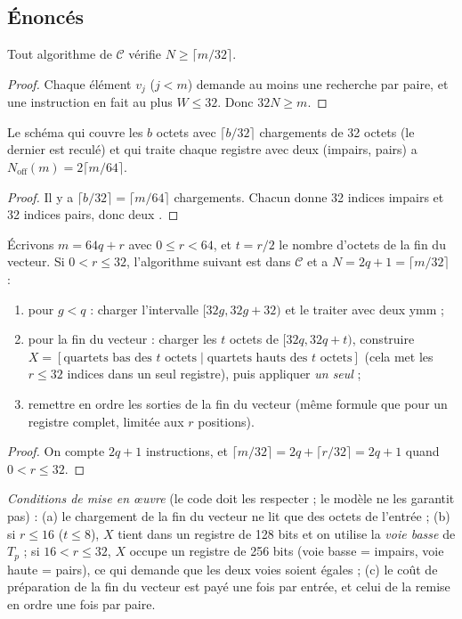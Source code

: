 \subsection{Énoncés}
\begin{proposition}[Limite]\label{prop:borne}
Tout algorithme de $\mathcal{C}$ vérifie $N\ge\lceil m/32\rceil$.
\end{proposition}
\begin{proof}
Chaque élément $v_j$ ($j<m$) demande au moins une recherche par paire, et une instruction en fait au plus $W\le32$. Donc $32N\ge m$.
\end{proof}

\begin{proposition}\label{prop:off}
Le schéma qui couvre les $b$ octets avec $\lceil b/32\rceil$ chargements de 32 octets (le dernier est reculé) et qui traite chaque registre avec deux \vpshufb{} (impairs, pairs) a $N_{\mathrm{off}}(m)=2\lceil m/64\rceil$.
\end{proposition}
\begin{proof}
Il y a $\lceil b/32\rceil=\lceil m/64\rceil$ chargements. Chacun donne 32 indices impairs et 32 indices pairs, donc deux \vpshufb{}.
\end{proof}

\begin{proposition}\label{prop:real}
Écrivons $m=64q+r$ avec $0\le r<64$, et $t=r/2$ le nombre d'octets de la fin du vecteur. Si $0<r\le32$, l'algorithme suivant est dans $\mathcal{C}$ et a $N=2q+1=\lceil m/32\rceil$ :
\begin{enumerate}[nosep]
\item pour $g<q$ : charger l'intervalle $[32g,32g+32)$ et le traiter avec deux \vpshufb{} ymm ;
\item pour la fin du vecteur : charger les $t$ octets de $[32q,32q+t)$, construire $X=[\text{quartets bas des }t\text{ octets}\mid\text{quartets hauts des }t\text{ octets}]$ (cela met les $r\le32$ indices dans un seul registre), puis appliquer \emph{un seul} \vpshufb{} ;
\item remettre en ordre les sorties de la fin du vecteur (même formule que pour un registre complet, limitée aux $r$ positions).
\end{enumerate}
\end{proposition}
\begin{proof}
On compte $2q+1$ instructions, et $\lceil m/32\rceil=2q+\lceil r/32\rceil=2q+1$ quand $0<r\le32$.
\end{proof}
\emph{Conditions de mise en œuvre} (le code doit les respecter ; le modèle ne les garantit pas) : (a) le chargement de la fin du vecteur ne lit que des octets de l'entrée ; (b) si $r\le16$ ($t\le8$), $X$ tient dans un registre de 128 bits et on utilise la \emph{voie basse} de $T_p$ ; si $16<r\le32$, $X$ occupe un registre de 256 bits (voie basse = impairs, voie haute = pairs), ce qui demande que les deux voies soient égales ; (c) le coût de préparation de la fin du vecteur est payé une fois par entrée, et celui de la remise en ordre une fois par paire.

